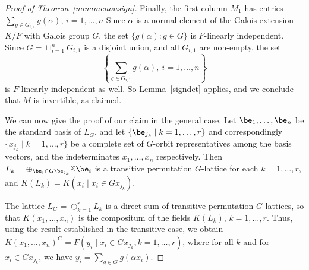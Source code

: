 \documentclass[12pt]{article}
\theoremstyle{plain}
\newcommand{\Z}{\ensuremath{\mathbb{Z}}}
\begin{document}
\begin{proof}[Proof of Theorem~\ref{nonamenonsign}]
  Finally, the first column $M_1$ has entries $\sum_{g \in
      G_{i,1}}g(\alpha)$, $i = 1, \ldots,n$ Since $\alpha$ is a
  normal element of the Galois extension $K/F$ with Galois group $G$,
  the set $\lbrace g(\alpha): g \in G \rbrace$ is $F$-linearly
  independent. Since $G = \sqcup^n_{i =1}G_{i,1}$ is a disjoint union,
  and all $G_{i,1}$ are non-empty,
  the set
  $$\left\lbrace \sum_{g \in G_{i,1}}g(\alpha),\ i = 1, \ldots, n
  \right\rbrace$$ is $F$-linearly independent as well.  So
  Lemma~\ref{signdet} applies, and we conclude that $M$ is invertible,
  as claimed.

  \medskip 
  
  We can now give the proof of our claim in the general case.  Let
  $\be_1, \ldots , \be_n$ be the standard basis of $L_G$, and let
  $\{\be_{j_k} \mid k = 1, \ldots, r\}$ and correspondingly $\{x_{j_k}
  \mid k = 1, \ldots, r\}$ be a complete set of $G$-orbit
  representatives among the basis vectors, and the indeterminates
  $x_1, \ldots, x_n$ respectively. Then $L_k = \oplus_{ \be_i \in G
    \be_{j_{k}} } \Z \be_i$ is a transitive permutation $G$-lattice
  for each $k = 1, \ldots, r$, and $K(L_k) = K(x_i \mid x_i \in
  Gx_{j_k})$.
  
  The lattice $L_G = \oplus^r_{k =1} L_k$ is a direct sum of transitive
  permutation $G$-lattices, 
  so that $K(x_1,\dots,x_n)$
  is the
  compositum of the fields $K(L_k)$, $k=1,\dots,r$. Thus, using the 
  result established in the transitive case, we obtain
  $K(x_1,\dots,x_n)^G=F(y_i \mid x_i \in Gx_{j_k}, k=1,\dots,r)$, where
  for all $k$ and for $x_i \in Gx_{j_k}$, we have $y_i=\sum_{g \in G}
  g(\alpha x_i)$.
\end{proof}
\end{document}
